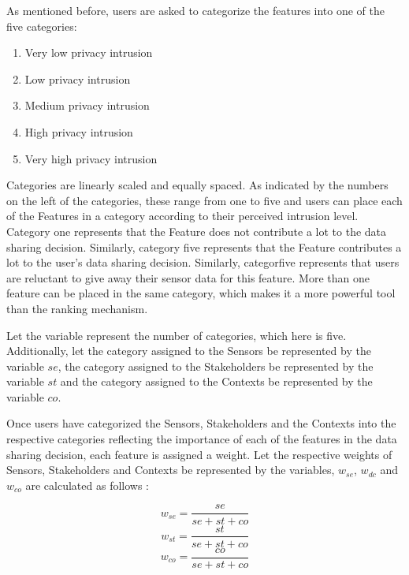 As mentioned before, users are asked to categorize the features into one of the five categories:

\begin{enumerate}
\item Very low privacy intrusion
\item Low privacy intrusion
\item Medium privacy intrusion
\item High privacy intrusion
\item Very high privacy intrusion
\end{enumerate}

Categories are linearly scaled and equally spaced. As indicated by the numbers on the left of the categories, these range from one to five and users can place each of the Features in a category according to their perceived intrusion level. Category one represents that the Feature does not contribute a lot to the data sharing decision. Similarly, category five represents that the Feature  contributes a lot to the user's data sharing decision. Similarly, categorfive represents that users are reluctant to give away their sensor data for this feature. More than one feature can be placed in the same category, which makes it a more powerful tool than the ranking mechanism.

Let the variable \numcategories represent the number of categories, which here is five. Additionally, let the category assigned to the Sensors be represented by the variable $se$, the category assigned to the Stakeholders be represented by the variable $st$ and the category assigned to the Contexts be represented by the variable $co$.

Once users have categorized the Sensors, Stakeholders and the Contexts into the respective categories reflecting the importance of each of the features in the data sharing decision, each feature is assigned a weight.
Let the respective weights of Sensors, Stakeholders and Contexts be represented by the variables, $w_{se}$, $w_{dc}$ and $w_{co}$ are calculated as follows :

\begin{equation}
   w_{se} = \frac{se}{se+st+co} 
\end{equation}
\begin{equation}
   w_{st} = \frac{st}{se+st+co}  
\end{equation}
\begin{equation}
   w_{co} = \frac{co}{se+st+co}  
\end{equation}


